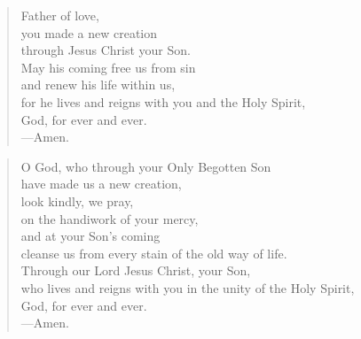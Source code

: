 \prayer

\setlength{\vleftmargin}{\prayerleftmargini}

\begin{verse}
Father of love,\\
you made a new creation\\
through Jesus Christ your Son.\\
May his coming free us from sin\\
and renew his life within us,\\
for he lives and reigns with you and the Holy Spirit,\\
God, for ever and ever.\\
{\color{red}---\thinspace}Amen.
\end{verse}


\begin{verse}
O God, who through your Only Begotten Son\\
have made us a new creation,\\
look kindly, we pray,\\
on the handiwork of your mercy,\\
and at your Son’s coming\\
cleanse us from every stain of the old way of life.\\
Through our Lord Jesus Christ, your Son,\\
who lives and reigns with you in the unity of the Holy Spirit,\\
God, for ever and ever.\\
{\color{red}---\thinspace}Amen.
\end{verse}

\setlength{\vleftmargin}{\defleftmargini}